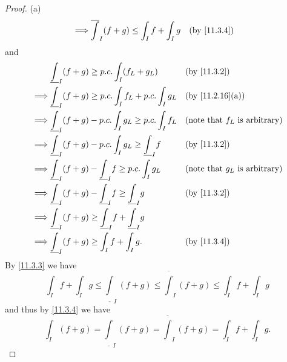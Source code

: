 \begin{proof}{(a)}
\begin{align*}
    \implies & \overline{\int}_I (f + g) \leq \int_I f + \int_I g                       &   & \by{11.3.4}
  \end{align*}
  and
  \begin{align*}
             & \underline{\int}_I (f + g) \geq p.c. \int_I (f_L + g_L)                     &   & \by{11.3.2}                             \\
    \implies & \underline{\int}_I (f + g) \geq p.c. \int_I f_L + p.c. \int_I g_L           &   & \text{(by \cref{11.2.16}(a))}           \\
    \implies & \underline{\int}_I (f + g) - p.c. \int_I g_L \geq p.c. \int_I f_L           &   & \text{(note that \(f_L\) is arbitrary)} \\
    \implies & \underline{\int}_I (f + g) - p.c. \int_I g_L \geq \underline{\int}_I f      &   & \by{11.3.2}                             \\
    \implies & \underline{\int}_I (f + g) - \underline{\int}_I f \geq p.c. \int_I g_L      &   & \text{(note that \(g_L\) is arbitrary)} \\
    \implies & \underline{\int}_I (f + g) - \underline{\int}_I f \geq \underline{\int}_I g &   & \by{11.3.2}                             \\
    \implies & \underline{\int}_I (f + g) \geq \underline{\int}_I f + \underline{\int}_I g &                                             \\
    \implies & \underline{\int}_I (f + g) \geq \int_I f + \int_I g.                        &   & \by{11.3.4}
  \end{align*}
  By \cref{11.3.3} we have
  \[
    \int_I f + \int_I g \leq \underline{\int}_I (f + g) \leq \overline{\int}_I (f + g) \leq \int_I f + \int_I g
  \]
  and thus by \cref{11.3.4} we have
  \[
    \int_I (f + g) = \underline{\int}_I (f + g) = \overline{\int}_I (f + g) = \int_I f + \int_I g.
  \]
\end{proof}

